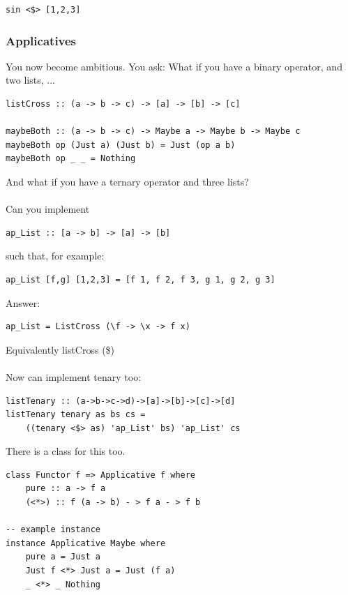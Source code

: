 \documentclass[12pt]{article}
\begin{document}
\begin{lstlisting}
sin <$> [1,2,3]
\end{lstlisting}

\subsubsection{Applicatives}

You now become ambitious. You ask: What if you have a binary operator, and two lists, ...

\begin{lstlisting}
listCross :: (a -> b -> c) -> [a] -> [b] -> [c]

maybeBoth :: (a -> b -> c) -> Maybe a -> Maybe b -> Maybe c
maybeBoth op (Just a) (Just b) = Just (op a b)
maybeBoth op _ _ = Nothing
\end{lstlisting}

And what if you have a ternary operator and three lists?\\
\\
Can you implement
\begin{lstlisting}
ap_List :: [a -> b] -> [a] -> [b]
\end{lstlisting}

such that, for example:

\begin{lstlisting}
ap_List [f,g] [1,2,3] = [f 1, f 2, f 3, g 1, g 2, g 3]
\end{lstlisting}

Answer:
\begin{lstlisting}
ap_List = ListCross (\f -> \x -> f x)
\end{lstlisting}
Equivalently listCross (\$)\\
\\
Now can implement tenary too:

\begin{lstlisting}
listTenary :: (a->b->c->d)->[a]->[b]->[c]->[d]
listTenary tenary as bs cs = 
	((tenary <$> as) 'ap_List' bs) 'ap_List' cs
\end{lstlisting}

There is a class for this too.

\begin{lstlisting}
class Functor f => Applicative f where
	pure :: a -> f a
	(<*>) :: f (a -> b) - > f a - > f b
	
-- example instance
instance Applicative Maybe where
	pure a = Just a
	Just f <*> Just a = Just (f a)
	_ <*> _ Nothing
\end{lstlisting}
\end{document}
